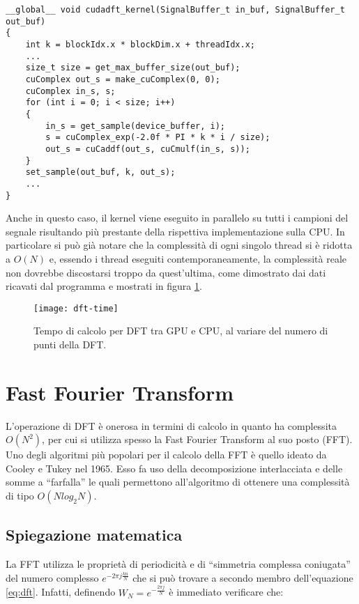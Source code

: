 \begin{lstlisting}
__global__ void cudadft_kernel(SignalBuffer_t in_buf, SignalBuffer_t out_buf)
{
    int k = blockIdx.x * blockDim.x + threadIdx.x;
    ...
    size_t size = get_max_buffer_size(out_buf);
    cuComplex out_s = make_cuComplex(0, 0);
    cuComplex in_s, s;
    for (int i = 0; i < size; i++)
    {
        in_s = get_sample(device_buffer, i);
        s = cuComplex_exp(-2.0f * PI * k * i / size);
        out_s = cuCaddf(out_s, cuCmulf(in_s, s));
    }
    set_sample(out_buf, k, out_s);
    ...
}

\end{lstlisting}

Anche in questo caso, il kernel viene eseguito in parallelo su tutti i campioni del segnale risultando più prestante della rispettiva implementazione sulla CPU. In particolare si può già notare che la complessità di ogni singolo thread si è ridotta a $O(N)$ e, essendo i thread eseguiti contemporaneamente, la complessità reale non dovrebbe discostarsi troppo da quest'ultima, come dimostrato dai dati ricavati dal programma e mostrati in figura \ref{fig:dfttime}.

\begin{figure}[h!]
    \centering
    \texttt{[image: dft-time]}
    \caption{Tempo di calcolo per DFT tra GPU e CPU, al variare del numero di punti della DFT.}
    \label{fig:dfttime}
\end{figure}

\section{Fast Fourier Transform}
L'operazione di DFT è onerosa in termini di calcolo in quanto ha complessita $O(N^2)$, per cui si utilizza spesso la Fast Fourier Transform al suo posto (FFT). Uno degli algoritmi più popolari per il calcolo della FFT è quello ideato da Cooley e Tukey nel 1965. Esso fa uso della decomposizione interlacciata e delle somme a ``farfalla'' le quali permettono all'algoritmo di ottenere una complessità di tipo $O(N log_2N)$.

\subsection{Spiegazione matematica}
La FFT utilizza le proprietà di periodicità e di ``simmetria complessa coniugata'' del numero complesso $e^{-2\pi j\frac{kn}{N}}$ che si può trovare a secondo membro dell'equazione \ref{eq:dft}. Infatti, definendo $W_N=e^{-\frac{2\pi j}{N}}$ è immediato verificare che:

